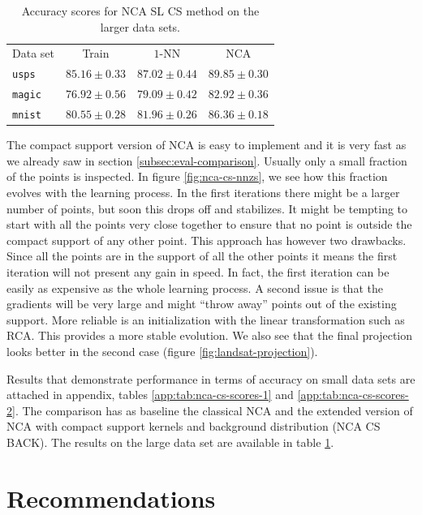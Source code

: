\begin{table}
            	\centering
            	\begin{tabular}{lccc}
            	\toprule
            	Data set & Train & $1$-NN & NCA \\
            	\cmidrule(r){2-2}\cmidrule(r){3-4}
\texttt{usps}&$85.16 \pm 0.33$&$87.02 \pm 0.44$&$89.85 \pm 0.30$\\ 
\texttt{magic}&$76.92 \pm 0.56$&$79.09 \pm 0.42$&$82.92 \pm 0.36$\\ 
\texttt{mnist}&$80.55 \pm 0.28$&$81.96 \pm 0.26$&$86.36 \pm 0.18$\\ 
  \bottomrule
  \end{tabular}
  \caption{Accuracy scores for NCA SL CS method on the larger data sets.}
  \label{tab:nca-cs-scores}
\end{table}

The compact support version of NCA is easy to implement and it is very fast as we already saw in section \ref{subsec:eval-comparison}. Usually only a small fraction of the points is inspected. In figure \ref{fig:nca-cs-nnzs}, we see how this fraction evolves with the learning process. In the first iterations there might be a larger number of points, but soon this drops off and stabilizes. It might be tempting to start with all the points very close together to ensure that no point is outside the compact support of any other point. This approach has however two drawbacks. Since all the points are in the support of all the other points it means the first iteration will not present any gain in speed. In fact, the first iteration can be easily as expensive as the whole learning process. A second issue is that the gradients will be very large and might ``throw away'' points out of the existing support. More reliable is an initialization with the linear transformation such as RCA. This provides a more stable evolution. We also see that the final projection looks better in the second case (figure \ref{fig:landsat-projection}).

Results that demonstrate performance in terms of accuracy on small data sets are attached in appendix, tables \ref{app:tab:nca-cs-scores-1} and \ref{app:tab:nca-cs-scores-2}. The comparison has as baseline the classical NCA and the extended version of NCA with compact support kernels and background distribution (NCA CS BACK). The results on the large data set are available in table \ref{tab:nca-cs-scores}. 

\section{Recommendations}
\label{sec:eval-recommendations}

